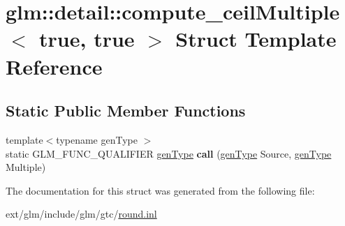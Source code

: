 \hypertarget{structglm_1_1detail_1_1compute__ceil_multiple_3_01true_00_01true_01_4}{\section{glm\-:\-:detail\-:\-:compute\-\_\-ceil\-Multiple$<$ true, true $>$ Struct Template Reference}
\label{structglm_1_1detail_1_1compute__ceil_multiple_3_01true_00_01true_01_4}
}
\subsection*{Static Public Member Functions}
\begin{DoxyCompactItemize}
\item 
\hypertarget{structglm_1_1detail_1_1compute__ceil_multiple_3_01true_00_01true_01_4_a6d9103207c947da13d0319d2d4d071d9}{{\footnotesize template$<$typename gen\-Type $>$ }\\static G\-L\-M\-\_\-\-F\-U\-N\-C\-\_\-\-Q\-U\-A\-L\-I\-F\-I\-E\-R \hyperlink{structglm_1_1detail_1_1gen_type}{gen\-Type} {\bfseries call} (\hyperlink{structglm_1_1detail_1_1gen_type}{gen\-Type} Source, \hyperlink{structglm_1_1detail_1_1gen_type}{gen\-Type} Multiple)}\label{structglm_1_1detail_1_1compute__ceil_multiple_3_01true_00_01true_01_4_a6d9103207c947da13d0319d2d4d071d9}

\end{DoxyCompactItemize}


The documentation for this struct was generated from the following file\-:\begin{DoxyCompactItemize}
\item 
ext/glm/include/glm/gtc/\hyperlink{round_8inl}{round.\-inl}\end{DoxyCompactItemize}
